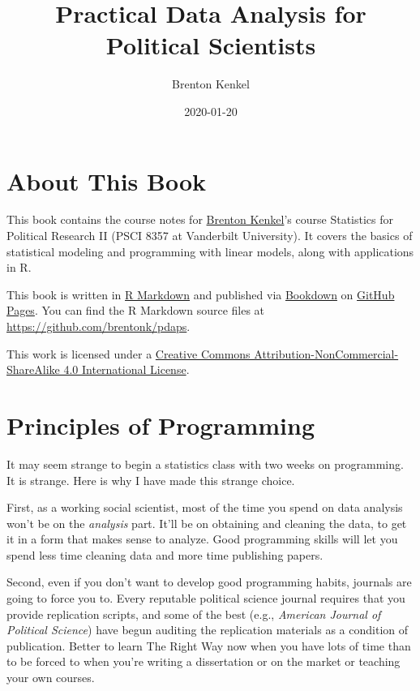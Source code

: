 \documentclass[
  12pt,
  oneside,openany]{book}
\title{Practical Data Analysis for Political Scientists}
\author{Brenton Kenkel}
\date{2020-01-20}
\begin{document}
\frontmatter
\maketitle

{
\setcounter{tocdepth}{1}
\tableofcontents
}
\mainmatter
\hypertarget{about-this-book}{%
\chapter{About This Book}\label{about-this-book}}

This book contains the course notes for \href{http://bkenkel.com}{Brenton Kenkel}'s course Statistics for Political Research II (PSCI 8357 at Vanderbilt University). It covers the basics of statistical modeling and programming with linear models, along with applications in R.

This book is written in \href{http://rmarkdown.rstudio.com}{R Markdown} and published via \href{https://bookdown.org}{Bookdown} on \href{https://pages.github.com}{GitHub Pages}. You can find the R Markdown source files at \url{https://github.com/brentonk/pdaps}.

This work is licensed under a \href{http://creativecommons.org/licenses/by-nc-sa/4.0/}{Creative Commons Attribution-NonCommercial-ShareAlike 4.0 International License}.

\hypertarget{programming}{%
\chapter{Principles of Programming}\label{programming}}

It may seem strange to begin a statistics class with two weeks on programming. It is strange. Here is why I have made this strange choice.

First, as a working social scientist, most of the time you spend on data analysis won't be on the \emph{analysis} part. It'll be on obtaining and cleaning the data, to get it in a form that makes sense to analyze. Good programming skills will let you spend less time cleaning data and more time publishing papers.

Second, even if you don't want to develop good programming habits, journals are going to force you to. Every reputable political science journal requires that you provide replication scripts, and some of the best (e.g., \emph{American Journal of Political Science}) have begun auditing the replication materials as a condition of publication. Better to learn The Right Way now when you have lots of time than to be forced to when you're writing a dissertation or on the market or teaching your own courses.
\end{document}
